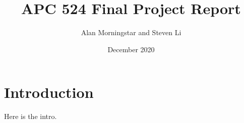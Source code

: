 \documentclass{article}
\title{APC 524 Final Project Report}
\author{Alan Morningstar and Steven Li}
\date{December 2020}
\begin{document}
\maketitle

\section{Introduction}
Here is the intro.
\end{document}
